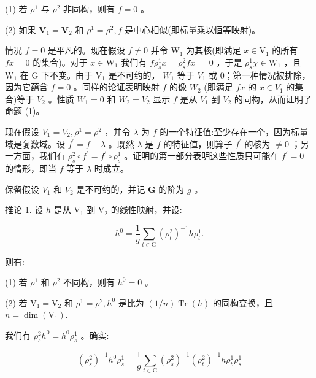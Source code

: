 \documentclass[10pt]{article}
\begin{document}
(1) 若 \({\rho }^{1}\) 与 \({\rho }^{2}\) 非同构，则有 \(f = 0\) 。

(2) 如果 \({\mathbf{V}}_{1} = {\mathbf{V}}_{2}\) 和 \({\rho }^{1} = {\rho }^{2},f\) 是中心相似(即标量乘以恒等映射)。

情况 \(f = 0\) 是平凡的。现在假设 \(f \neq  0\) 并令 \({\mathrm{W}}_{1}\) 为其核(即满足 \(x \in  {\mathrm{V}}_{1}\) 的所有 \({fx} = 0\) 的集合)。对于 \(x \in  {\mathrm{W}}_{1}\) 我们有 \(f{\rho }_{s}^{1}x = {\rho }_{s}^{2}{fx} \; = 0\) ，于是 \({\rho }_{s}^{1}\chi  \in  {\mathrm{W}}_{1}\) ，且 \({\mathrm{W}}_{1}\) 在 G 下不变。由于 \({\mathrm{V}}_{1}\) 是不可约的， \({W}_{1}\) 等于 \({V}_{1}\) 或 0；第一种情况被排除，因为它蕴含 \(f = 0\) 。同样的论证表明映射 \(f\) 的像 \({W}_{2}\) (即满足 \({fx}\) 的 \(x \in  {V}_{1}\) 的集合)等于 \({V}_{2}\) 。性质 \({W}_{1} = 0\) 和 \({W}_{2} = {V}_{2}\) 显示 \(f\) 是从 \({V}_{1}\) 到 \({V}_{2}\) 的同构，从而证明了命题 (1)。

现在假设 \({V}_{1} = {V}_{2},{\rho }^{1} = {\rho }^{2}\) ，并令 \(\lambda\) 为 \(f\) 的一个特征值:至少存在一个，因为标量域是复数域。设 \({f}^{\prime } = f - \lambda\) 。既然 \(\lambda\) 是 \(f\) 的特征值，则算子 \({f}^{\prime }\) 的核为 \(\neq  0\) ；另一方面，我们有 \({\rho }_{s}^{2} \circ  {f}^{\prime } = {f}^{\prime } \circ  {\rho }_{s}^{1}\) 。证明的第一部分表明这些性质只可能在 \({f}^{\prime } = 0\) 的情形，即当 \(f\) 等于 \(\lambda\) 时成立。

保留假设 \({V}_{1}\) 和 \({V}_{2}\) 是不可约的，并记 \(\mathbf{G}\) 的阶为 \(g\) 。

推论 1. 设 \(h\) 是从 \({\mathrm{V}}_{1}\) 到 \({\mathrm{V}}_{2}\) 的线性映射，并设:

\[
{h}^{0} = \frac{1}{g}\mathop{\sum }\limits_{{t \in  \mathrm{G}}}{\left( {\rho }_{t}^{2}\right) }^{-1}h{\rho }_{t}^{1}.
\]

则有:

(1) 若 \({\rho }^{1}\) 和 \({\rho }^{2}\) 不同构，则有 \({h}^{0} = 0\) 。

(2) 若 \({\mathrm{V}}_{1} = {\mathrm{V}}_{2}\) 和 \({\rho }^{1} = {\rho }^{2},{h}^{0}\) 是比为 \(\left( {1/n}\right) \operatorname{Tr}\left( h\right)\) 的同构变换，且 \(n = \dim \left( {\mathrm{V}}_{1}\right) .\)

我们有 \({\rho }_{s}^{2}{h}^{0} = {h}^{0}{\rho }_{s}^{1}\) 。确实:

\[
{\left( {\rho }_{s}^{2}\right) }^{-1}{h}^{0}{\rho }_{s}^{1} = \frac{1}{g}\mathop{\sum }\limits_{{t \in  \mathrm{G}}}{\left( {\rho }_{s}^{2}\right) }^{-1}{\left( {\rho }_{t}^{2}\right) }^{-1}h{\rho }_{t}^{1}{\rho }_{s}^{1}
\]
\end{document}
